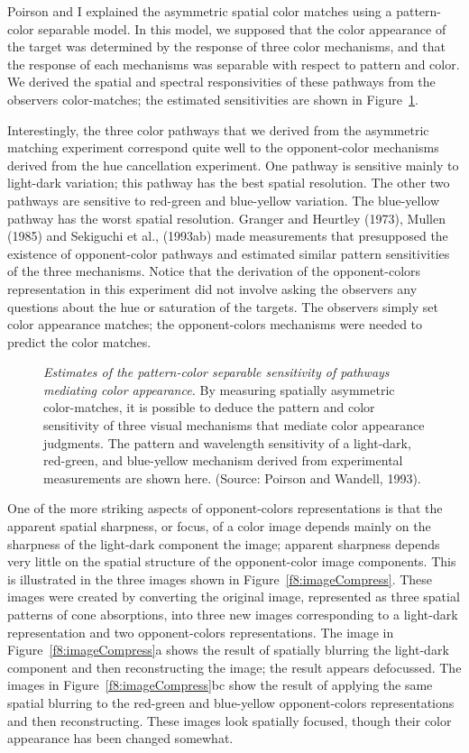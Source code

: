 Poirson and I explained the asymmetric spatial color matches using a
pattern-color separable model.  In this model, we supposed that the
color appearance of the target was determined by the response of three
color mechanisms, and that the response of each mechanisms was
separable with respect to pattern and color.  We derived the spatial
and spectral responsivities of these pathways from the observers
color-matches; the estimated sensitivities are shown in
Figure~\ref{f8:oPathways}.

Interestingly, the three color pathways that we derived from the
asymmetric matching experiment correspond quite well to the
opponent-color mechanisms derived from the hue cancellation
experiment.  One pathway is sensitive mainly to light-dark variation;
this pathway has the best spatial resolution.  The other two pathways
are sensitive to red-green and blue-yellow variation.  The blue-yellow
pathway has the worst spatial resolution.  Granger and Heurtley
(1973), Mullen (1985) and Sekiguchi et al., (1993ab) made
measurements that presupposed the existence of opponent-color pathways
and estimated similar pattern sensitivities of the three mechanisms.
Notice that the derivation of the opponent-colors representation in this
experiment did not involve asking the observers any questions about
the hue or saturation of the targets.  The observers simply set color
appearance matches;  the opponent-colors mechanisms were needed to
predict the color matches.
\begin{figure}
\centerline{
}
\caption[Opponent pathway sensitivity:  color appearance]{
{\em Estimates of the pattern-color separable sensitivity of pathways
mediating color appearance.}  By measuring spatially asymmetric
color-matches, it is possible to deduce the pattern and color
sensitivity of three visual mechanisms that mediate color appearance
judgments.  The pattern and wavelength sensitivity of a light-dark,
red-green, and blue-yellow mechanism derived from experimental
measurements are shown here.  (Source:  Poirson and Wandell, 1993).
}
\label{f8:oPathways}
\end{figure}

One of the more striking aspects of opponent-colors representations is that
the apparent spatial sharpness, or focus, of a color image depends
mainly on the sharpness of the light-dark component the image; apparent
sharpness depends very little on the spatial structure of the opponent-color
image components.  This is illustrated in the three images shown in
Figure~\ref{f8:imageCompress}.  These images were created by
converting the original image, represented as three spatial patterns
of cone absorptions, into three new images corresponding to a
light-dark representation and two opponent-colors representations.
The image in Figure~\ref{f8:imageCompress}a shows the result of
spatially blurring the light-dark component and then reconstructing
the image; the result appears defocussed.  The images in
Figure~\ref{f8:imageCompress}bc show the result of applying the same
spatial blurring to the red-green and blue-yellow opponent-colors
representations and then reconstructing.  These images look spatially
focused, though their color appearance has been changed somewhat.

